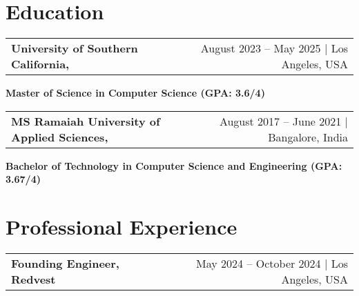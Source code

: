 \documentclass[10pt, legalpaper]{article}
\newenvironment{onecolentry}{
    \par\noindent
}{
    \par
}
\begin{document}


\section{Education}

\begin{tabularx}{\textwidth}{@{}Xr@{}}
    \textbf{University of Southern California,} & August 2023 – May 2025 | Los Angeles, USA \\
\end{tabularx}
\vspace{-4.5mm}
\begin{onecolentry}

    \textbf{Master of Science in Computer Science (GPA: 3.6/4)}
\end{onecolentry}

\vspace{0.1 cm}


\begin{tabularx}{\textwidth}{@{}Xr@{}}
    \textbf{MS Ramaiah University of Applied Sciences,} & August 2017 – June 2021 | Bangalore, India \\
\end{tabularx}
\vspace{-4.5mm}
\begin{onecolentry}

\textbf{Bachelor of Technology in Computer Science and Engineering (GPA: 3.67/4)}
\end{onecolentry}

\section{Professional Experience}

\begin{tabularx}{\textwidth}{@{}Xr@{}}
    \textbf{Founding Engineer, Redvest} & May 2024 – October 2024 | Los Angeles, USA \\
\end{tabularx}
\vspace{-5mm}
\end{document}
